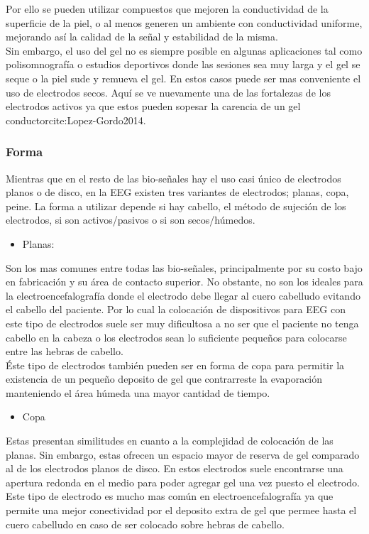 Por ello se pueden utilizar compuestos que mejoren la conductividad de la superficie de la piel, o al menos generen un ambiente con conductividad uniforme, mejorando así la calidad de la señal y estabilidad de la misma.\\

Sin embargo, el uso del gel no es siempre posible en algunas aplicaciones tal como polisomnografía o estudios deportivos donde las sesiones sea muy larga y el gel se seque o la piel sude y remueva el gel. En estos casos puede ser mas conveniente el uso de electrodos secos. Aquí se ve nuevamente una de las fortalezas de los electrodos activos ya que estos pueden sopesar la carencia de un gel conductorcite:Lopez-Gordo2014.\\

\subsubsection{Forma}
\label{sec:orgfbbecca}
Mientras que en el resto de las bio-señales hay el uso casi único de electrodos planos o de disco, en la EEG existen tres variantes de electrodos; planas, copa, peine. La forma a utilizar depende si hay cabello, el método de sujeción de los electrodos, si son activos/pasivos o si son secos/húmedos.\\

\begin{itemize}
\item Planas:\\
\end{itemize}
Son los mas comunes entre todas las bio-señales, principalmente por su costo bajo en fabricación y su área de contacto superior. No obstante, no son los ideales para la electroencefalografía donde el electrodo debe llegar al cuero cabelludo evitando el cabello del paciente. Por lo cual la colocación de dispositivos para EEG con este tipo de electrodos suele ser muy dificultosa a no ser que el paciente no tenga cabello en la cabeza o los electrodos sean lo suficiente pequeños para colocarse entre las hebras de cabello.\\

Éste tipo de electrodos también pueden ser en forma de copa para permitir la existencia de un pequeño deposito de gel que contrarreste la evaporación manteniendo el área húmeda una mayor cantidad de tiempo.\\

\begin{itemize}
\item Copa\\
\end{itemize}
Estas presentan similitudes en cuanto a la complejidad de colocación de las planas. Sin embargo, estas ofrecen un espacio mayor de reserva de gel comparado al de los electrodos planos de disco. En estos electrodos suele encontrarse una apertura redonda en el medio para poder agregar gel una vez puesto el electrodo. Este tipo de electrodo es mucho mas común en electroencefalografía ya que permite una mejor conectividad por el deposito extra de gel que permee hasta el cuero cabelludo en caso de ser colocado sobre hebras de cabello.\\

